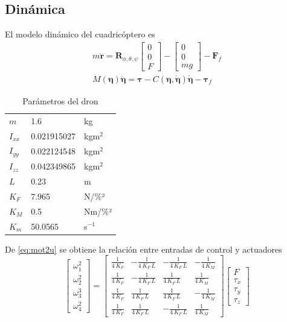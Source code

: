 \subsection{Dinámica}
El modelo dinámico del cuadricóptero es
\begin{gather}
	m\ddot{\mathbf{r}} = \mathbf{R}_{\phi,\theta,\psi}\begin{bmatrix}
	0\\0\\F\end{bmatrix} - \begin{bmatrix}0\\0\\mg\end{bmatrix} - \mathbf{F}_f\\
	M(\boldsymbol{\eta})\ddot{\boldsymbol{\eta}} = \boldsymbol{\tau} - C(\boldsymbol{\eta},\dot{\boldsymbol{\eta}})\dot{\boldsymbol{\eta}} - \boldsymbol{\tau}_f
\end{gather}
\begin{table}
	\centering
	\caption{Parámetros del dron}
	\label{tab:param_dron}
	\begin{tabular}{l l l}
		$m$ & 1.6 & kg \\
		$I_{xx}$ & 0.021915027 & kgm$^2$ \\
		$I_{yy} $ & 0.022124548 & kgm$^2$ \\
		$I_{zz}$ & 0.042349865 & kgm$^2$ \\
		$L$ & 0.23 & m \\
		$K_F$ & 7.965 & N/\%²\\
		$K_M$ & 0.5 & Nm/\%²\\
		$K_m$ & 50.0565 & s$^{-1}$
	\end{tabular}
\end{table}
De \eqref{eq:mot2u} se obtiene la relación entre entradas de control y actuadores
\begin{equation}
	\label{eq:u2mot}
	\begin{bmatrix}
		\omega_1^2\\
		\omega_2^2\\
		\omega_3^3\\
		\omega_4^2
	\end{bmatrix}
	=
	\left[\begin{array}{cccc}
		\frac{1}{4\,K_F } & -\frac{1}{4\,K_F \,L}  & -\frac{1}{4\,K_F \,L}  & -\frac{1}{4\,K_M }\\
		\frac{1}{4\,K_F } & -\frac{1}{4\,K_F \,L}  & \frac{1}{4\,K_F \,L}  & \frac{1}{4\,K_M }\\
		\frac{1}{4\,K_F } & \frac{1}{4\,K_F \,L}  & \frac{1}{4\,K_F \,L}  & -\frac{1}{4\,K_M }\\
		\frac{1}{4\,K_F } & \frac{1}{4\,K_F \,L}  & -\frac{1}{4\,K_F \,L} & \frac{1}{4\,K_M }
	\end{array}\right]
	\begin{bmatrix}
		F\\
		\tau_x\\
		\tau_y\\
		\tau_z
	\end{bmatrix}
\end{equation}

